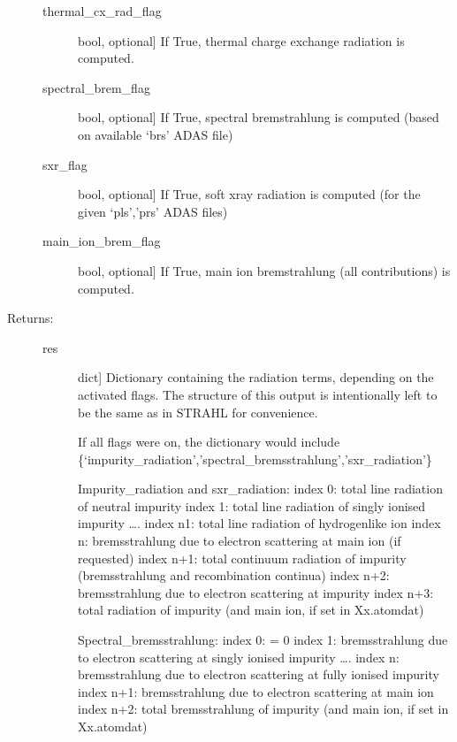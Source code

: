 \documentclass[letterpaper,10pt,english]{sphinxmanual}
\begin{document}
\begin{fulllineitems}
\begin{description}
\begin{description}
\item[{thermal\_cx\_rad\_flag}] \leavevmode{[}bool, optional{]}
If True, thermal charge exchange radiation is computed.

\item[{spectral\_brem\_flag}] \leavevmode{[}bool, optional{]}
If True, spectral bremstrahlung is computed (based on available ‘brs’ ADAS file)

\item[{sxr\_flag}] \leavevmode{[}bool, optional{]}
If True, soft x\sphinxhyphen{}ray radiation is computed (for the given ‘pls’,’prs’ ADAS files)

\item[{main\_ion\_brem\_flag}] \leavevmode{[}bool, optional{]}
If True, main ion bremstrahlung (all contributions) is computed.

\end{description}

\item[{Returns:}] \leavevmode\begin{description}
\item[{res}] \leavevmode{[}dict{]}
Dictionary containing the radiation terms, depending on the activated flags.
The structure of this output is intentionally left to be the same as in STRAHL
for convenience.

If all flags were on, the dictionary would include
\{‘impurity\_radiation’,’spectral\_bremsstrahlung’,’sxr\_radiation’\}

Impurity\_radiation and sxr\_radiation:
index 0: total line radiation of neutral impurity
index 1: total line radiation of singly ionised impurity
….
index n\sphinxhyphen{}1: total line radiation of hydrogen\sphinxhyphen{}like ion
index n: bremsstrahlung due to electron scattering at main ion (if requested)
index n+1: total continuum radiation of impurity (bremsstrahlung and recombination continua)
index n+2: bremsstrahlung due to electron scattering at impurity
index n+3: total radiation of impurity (and main ion, if set in Xx.atomdat)

Spectral\_bremsstrahlung:
index 0: = 0
index 1: bremsstrahlung due to electron scattering at singly ionised impurity
….
index n: bremsstrahlung due to electron scattering at fully ionised impurity
index n+1: bremsstrahlung due to electron scattering at main ion
index n+2: total bremsstrahlung of impurity (and main ion, if set in Xx.atomdat)

\end{description}

\end{description}

\end{fulllineitems}
\end{document}
